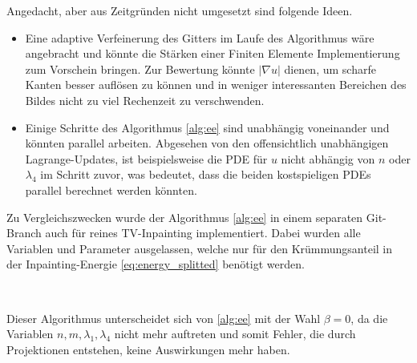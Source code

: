 \documentclass{mythesis}
\begin{document}
Angedacht, aber aus Zeitgründen nicht umgesetzt sind folgende Ideen.
\begin{itemize}
    \item
	Eine adaptive Verfeinerung des Gitters im Laufe des Algorithmus wäre angebracht und könnte die Stärken einer Finiten Elemente Implementierung zum Vorschein bringen.
	Zur Bewertung könnte $|\nabla u|$ dienen, um scharfe Kanten besser auflösen zu können und in weniger interessanten Bereichen des Bildes nicht zu viel Rechenzeit zu verschwenden.
    \item
	Einige Schritte des Algorithmus \ref{alg:ee} sind unabhängig voneinander und könnten parallel arbeiten.
	Abgesehen von den offensichtlich unabhängigen Lagrange-Updates, ist beispielsweise die PDE für $u$ nicht abhängig von $n$ oder $\lambda_4$ im Schritt zuvor, was bedeutet, dass die beiden kostspieligen PDEs parallel berechnet werden könnten.
\end{itemize}

Zu Vergleichszwecken wurde der Algorithmus \ref{alg:ee} in einem separaten Git-Branch auch für reines TV-Inpainting implementiert.
Dabei wurden alle Variablen und Parameter ausgelassen, welche nur für den Krümmungsanteil in der Inpainting-Energie \eqref{eq:energy_splitted} benötigt werden.

\begin{algorithm}[TV Inpainting] \label{alg:tv}
     \\
    \begin{algorithmic}
	\EndFor
    \end{algorithmic}
    \begin{note}
	Dieser Algorithmus unterscheidet sich von \ref{alg:ee} mit der Wahl $\beta = 0$, da die Variablen $n, m, \lambda_1, \lambda_4$ nicht mehr auftreten und somit Fehler, die durch Projektionen entstehen, keine Auswirkungen mehr haben.
    \end{note}
\end{algorithm}
\end{document}

